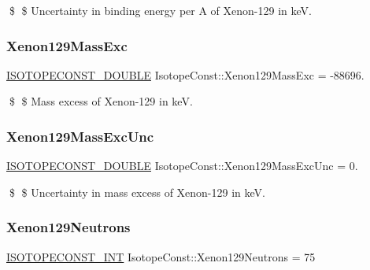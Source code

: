 \$ \$ Uncertainty in binding energy per A of Xenon-\/129 in keV. \mbox{\label{group___isotope_const-_xenon-_xe129_gadcef40e365f05a5792a2fea034640b79}} 
\subsubsection{\texorpdfstring{Xenon129\+Mass\+Exc}{Xenon129MassExc}}
{\footnotesize\ttfamily \mbox{\hyperlink{group___isotope_const-_macros_ga8f45a7272ce02c0b4c65c44636ed719a}{I\+S\+O\+T\+O\+P\+E\+C\+O\+N\+S\+T\+\_\+\+D\+O\+U\+B\+LE}} Isotope\+Const\+::\+Xenon129\+Mass\+Exc = -\/88696.}

\$ \$ Mass excess of Xenon-\/129 in keV. \mbox{\label{group___isotope_const-_xenon-_xe129_ga997bc13c0dfb62bb73f4f0dcb7526543}} 
\subsubsection{\texorpdfstring{Xenon129\+Mass\+Exc\+Unc}{Xenon129MassExcUnc}}
{\footnotesize\ttfamily \mbox{\hyperlink{group___isotope_const-_macros_ga8f45a7272ce02c0b4c65c44636ed719a}{I\+S\+O\+T\+O\+P\+E\+C\+O\+N\+S\+T\+\_\+\+D\+O\+U\+B\+LE}} Isotope\+Const\+::\+Xenon129\+Mass\+Exc\+Unc = 0.}

\$ \$ Uncertainty in mass excess of Xenon-\/129 in keV. \mbox{\label{group___isotope_const-_xenon-_xe129_ga386bbb6f3237b44bdc2279f139f979e8}} 
\subsubsection{\texorpdfstring{Xenon129\+Neutrons}{Xenon129Neutrons}}
{\footnotesize\ttfamily \mbox{\hyperlink{group___isotope_const-_macros_ga5f18360b3e99483a35c32d789e62621c}{I\+S\+O\+T\+O\+P\+E\+C\+O\+N\+S\+T\+\_\+\+I\+NT}} Isotope\+Const\+::\+Xenon129\+Neutrons = 75}

